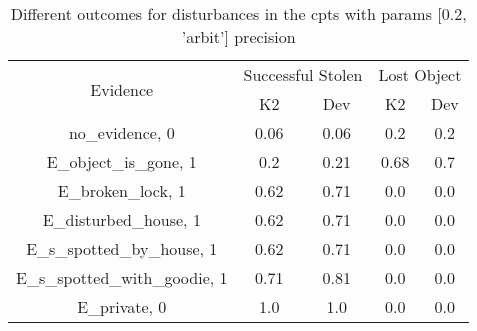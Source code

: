 \begin{table}\begin{tabular}{c|cc|cc}\toprule\multirow{2}{*}{Evidence} & \multicolumn{2}{c}{Successful Stolen} & \multicolumn{2}{c}{Lost Object} \\& {K2} & {Dev} & {K2} & {Dev} \\\midrule
no\_evidence, 0 & 0.06&0.06&0.2&0.2\\E\_object\_is\_gone, 1 & \cellcolor{Bittersweet}0.2&\cellcolor{Bittersweet}0.21&\cellcolor{Bittersweet}0.68&\cellcolor{Bittersweet}0.7\\E\_broken\_lock, 1 & \cellcolor{Bittersweet}0.62&\cellcolor{Bittersweet}0.71&0.0&0.0\\E\_disturbed\_house, 1 & \cellcolor{Bittersweet}0.62&\cellcolor{Bittersweet}0.71&0.0&0.0\\E\_s\_spotted\_by\_house, 1 & \cellcolor{Bittersweet}0.62&\cellcolor{Bittersweet}0.71&0.0&0.0\\E\_s\_spotted\_with\_goodie, 1 & \cellcolor{Bittersweet}0.71&\cellcolor{Bittersweet}0.81&0.0&0.0\\E\_private, 0 & 1.0&1.0&0.0&0.0\\\bottomrule\end{tabular}\caption{Different outcomes for disturbances in the cpts with params [0.2, 'arbit'] precision}\end{table}